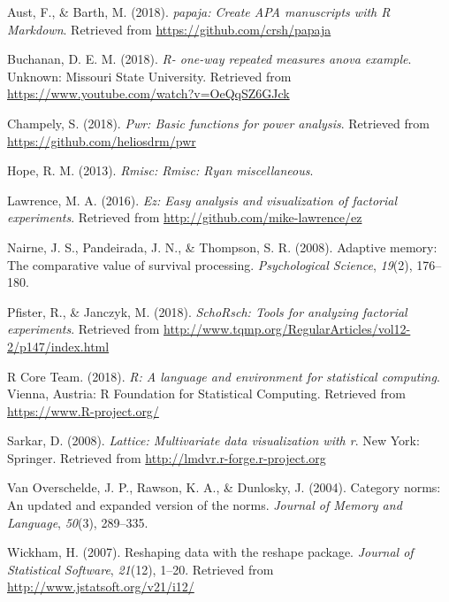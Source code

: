 \documentclass[man]{apa6}
\begin{document}
\begingroup
\setlength{\parindent}{-0.5in}
\setlength{\leftskip}{0.5in}

\hypertarget{refs}{}
\leavevmode\hypertarget{ref-R-papaja}{}%
Aust, F., \& Barth, M. (2018). \emph{papaja: Create APA manuscripts with R Markdown}. Retrieved from \url{https://github.com/crsh/papaja}

\leavevmode\hypertarget{ref-R-One-WayVid}{}%
Buchanan, D. E. M. (2018). \emph{R- one-way repeated measures anova example}. Unknown: Missouri State University. Retrieved from \url{https://www.youtube.com/watch?v=OeQqSZ6GJck}

\leavevmode\hypertarget{ref-R-pwr}{}%
Champely, S. (2018). \emph{Pwr: Basic functions for power analysis}. Retrieved from \url{https://github.com/heliosdrm/pwr}

\leavevmode\hypertarget{ref-R-Rmisc}{}%
Hope, R. M. (2013). \emph{Rmisc: Rmisc: Ryan miscellaneous}.

\leavevmode\hypertarget{ref-R-ez}{}%
Lawrence, M. A. (2016). \emph{Ez: Easy analysis and visualization of factorial experiments}. Retrieved from \url{http://github.com/mike-lawrence/ez}

\leavevmode\hypertarget{ref-nairne2008adaptive}{}%
Nairne, J. S., Pandeirada, J. N., \& Thompson, S. R. (2008). Adaptive memory: The comparative value of survival processing. \emph{Psychological Science}, \emph{19}(2), 176--180.

\leavevmode\hypertarget{ref-R-schoRsch}{}%
Pfister, R., \& Janczyk, M. (2018). \emph{SchoRsch: Tools for analyzing factorial experiments}. Retrieved from \url{http://www.tqmp.org/RegularArticles/vol12-2/p147/index.html}

\leavevmode\hypertarget{ref-R-base}{}%
R Core Team. (2018). \emph{R: A language and environment for statistical computing}. Vienna, Austria: R Foundation for Statistical Computing. Retrieved from \url{https://www.R-project.org/}

\leavevmode\hypertarget{ref-R-lattice}{}%
Sarkar, D. (2008). \emph{Lattice: Multivariate data visualization with r}. New York: Springer. Retrieved from \url{http://lmdvr.r-forge.r-project.org}

\leavevmode\hypertarget{ref-van2004category}{}%
Van Overschelde, J. P., Rawson, K. A., \& Dunlosky, J. (2004). Category norms: An updated and expanded version of the norms. \emph{Journal of Memory and Language}, \emph{50}(3), 289--335.

\leavevmode\hypertarget{ref-R-reshape2}{}%
Wickham, H. (2007). Reshaping data with the reshape package. \emph{Journal of Statistical Software}, \emph{21}(12), 1--20. Retrieved from \url{http://www.jstatsoft.org/v21/i12/}
\end{document}
